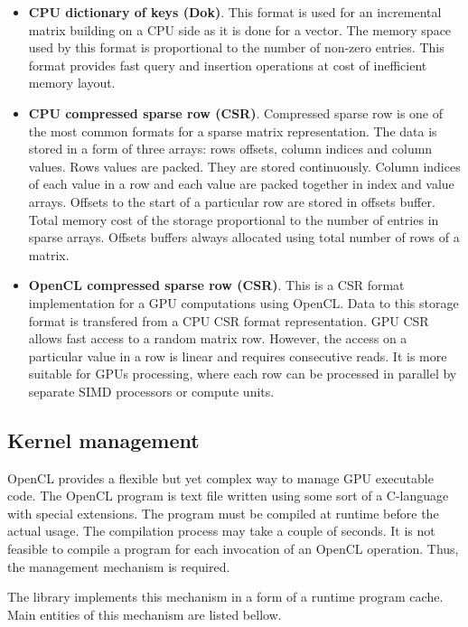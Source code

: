 \begin{itemize}
    \item \textbf{CPU dictionary of keys (Dok)}. This format is used for an incremental matrix building on a CPU side as it is done for a vector. The memory space used by this format is proportional to the number of non-zero entries. This format provides fast query and insertion operations at cost of inefficient memory layout.
    \item \textbf{CPU compressed sparse row (CSR)}. Compressed sparse row is one of the most common formats for a sparse matrix representation. The data is stored in a form of three arrays: rows offsets, column indices and column values. Rows values are packed. They are stored continuously. Column indices of each value in a row and each value are packed together in index and value arrays. Offsets to the start of a particular row are stored in offsets buffer. Total memory cost of the storage proportional to the number of entries in sparse arrays. Offsets buffers always allocated using total number of rows of a matrix. 
    \item \textbf{OpenCL compressed sparse row (CSR)}. This is a CSR format implementation for a GPU computations using OpenCL. Data to this storage format is transfered from a CPU CSR format representation. GPU CSR allows fast access to a random matrix row. However, the access on a particular value in a row is linear and requires consecutive reads. It is more suitable for GPUs processing, where each row can be processed in parallel by separate SIMD processors or compute units.
\end{itemize}

\subsection{Kernel management}

OpenCL provides a flexible but yet complex way to manage GPU executable code. The OpenCL program is text file written using some sort of a C-language with special extensions. The program must be compiled at runtime before the actual usage. The compilation process may take a couple of seconds. It is not feasible to compile a program for each invocation of an OpenCL operation. Thus, the management mechanism is required.

The library implements this mechanism in a form of a runtime program cache. Main entities of this mechanism are listed bellow.

